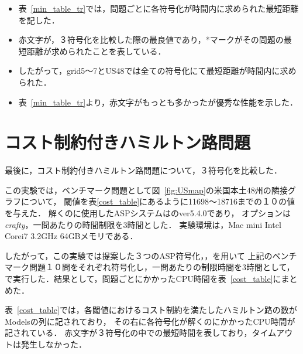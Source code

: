 \begin{itemize}
\item 表~\ref{min_table_tr}では，問題ごとに各符号化が時間内に求められた最短距離を記した．
\item 赤文字が，３符号化を比較した際の最良値であり，*マークがその問題の最短距離が求められたことを表している．
\item したがって，grid5〜7とUS48では全ての符号化にて最短距離が時間内に求められた．
\item 表~\ref{min_table_tr}より，赤文字がもっとも多かったが優秀な性能を示した．
\end{itemize}


\section{コスト制約付きハミルトン路問題}
最後に，コスト制約付きハミルトン路問題について，３符号化を比較した．

この実験では，ベンチマーク問題として図~\ref{fig:USmap}の米国本土48州の隣接グラフについて，
閾値を表\ref{cost_table}にあるように11698〜18716までの１０の値を与えた．
解くのに使用したASPシステムは{\clingo}のver5.4.0であり，
オプションは\textit{crafty}，一問あたりの時間制限を3時間とした．
実験環境は，Mac mini Intel Corei7 3.2GHz 64GBメモリである．

したがって，この実験では提案した３つのASP符号化，，を用いて
上記のベンチマーク問題１０問をそれぞれ符号化し，一問あたりの制限時間を3時間として，
{\clingo}で実行した．結果として，問題ごとにかかったCPU時間を表~\ref{cost_table}にまとめた．

表~\ref{cost_table}では，各閾値におけるコスト制約を満たしたハミルトン路の数が Modelsの列に記されており，
その右に各符号化が解くのにかかったCPU時間が記されている．
赤文字が３符号化の中での最短時間を表しており，タイムアウトは発生しなかった．


